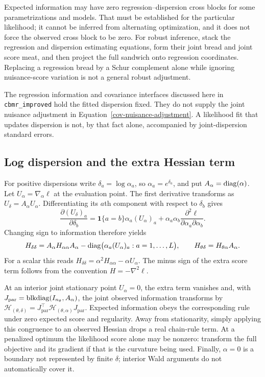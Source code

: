 Expected information may have zero regression--dispersion cross blocks
for some parametrizations and models.  That must be established for
the particular likelihood; it cannot be inferred from alternating
optimization, and it does not force the observed cross block to be
zero.  For robust inference, stack the regression and dispersion
estimating equations, form their joint bread and joint score meat,
and then project the full sandwich onto regression coordinates.
Replacing a regression bread by a Schur complement alone while
ignoring nuisance-score variation is not a general robust adjustment.

The regression information and covariance interfaces discussed here in
\texttt{cbmr\_improved} hold the fitted dispersion fixed.  They do
not supply the joint nuisance adjustment in
Equation~\eqref{cov-nuisance-adjustment}.  A likelihood fit that updates
dispersion is not, by that fact alone, accompanied by joint-dispersion
standard errors.

\subsection{Log dispersion and the extra Hessian term}
\label{cov-log-dispersion}

For positive dispersions write $\delta_a=\log\alpha_a$, so
$\alpha_a=e^{\delta_a}$, and put $A_\alpha=\operatorname{diag}(\alpha)$.
Let $U_\alpha=\nabla_\alpha\ell$ at the evaluation point.  The
first derivative transforms as
$U_\delta=A_\alpha U_\alpha$.  Differentiating its $a$th component
with respect to $\delta_b$ gives
\[
 \frac{\partial (U_\delta)_a}{\partial\delta_b}
 =\mathbf1\{a=b\}\alpha_a(U_\alpha)_a
   +\alpha_a\alpha_b
      \frac{\partial^2\ell}{\partial\alpha_a\partial\alpha_b}.
\]
Changing sign to information therefore yields
\begin{equation}
 H_{\delta\delta}
   =A_\alpha H_{\alpha\alpha}A_\alpha
            -\operatorname{diag}\bigl(\alpha_a(U_\alpha)_a:a=1,\ldots,L\bigr),
 \qquad H_{\theta\delta}=H_{\theta\alpha}A_\alpha .
 \label{cov-log-hessian}
\end{equation}
For a scalar this reads
$H_{\delta\delta}=\alpha^2H_{\alpha\alpha}-\alpha U_\alpha$.
The minus sign of the extra score term follows from the convention
$H=-\nabla^2\ell$.

At an interior joint stationary point $U_\alpha=0$, the extra term
vanishes and, with
$J_{\mathrm{par}}=\operatorname{blkdiag}(I_{n_\theta},A_\alpha)$,
the joint observed information transforms by
$\mathcal H_{(\theta,\delta)}
=J_{\mathrm{par}}^\top\mathcal H_{(\theta,\alpha)}J_{\mathrm{par}}$.
Expected information obeys the corresponding rule under zero expected
score and regularity.  Away from stationarity, simply applying this
congruence to an observed Hessian drops a real chain-rule term.
At a penalized optimum the likelihood score alone may be nonzero:
transform the full objective and its gradient if that is the curvature
being used.  Finally, $\alpha=0$ is a boundary not represented by
finite $\delta$; interior Wald arguments do not automatically cover it.

